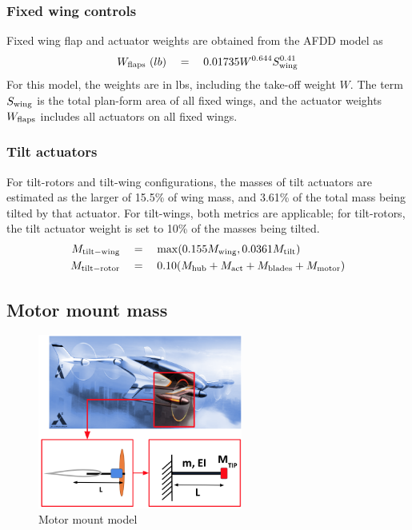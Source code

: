 \subsubsection{Fixed wing controls}
Fixed wing flap and actuator weights are obtained from the AFDD model as 
\begin{equation}
W_{\rm flaps} \textrm{ } (lb) \quad = \quad 0.01735 W^{0.644} S_{\rm wing}^{0.41}
\end{equation}
For this model, the weights are in lbs, including the take-off weight $W$. The term $S_{\rm wing}$ is the total plan-form area of all fixed wings, and the actuator weights $W_{\rm flaps}$ includes all actuators on all fixed wings.

\subsubsection{Tilt actuators}
For tilt-rotors and tilt-wing configurations, the masses of tilt actuators are estimated as the larger of 15.5\% of wing mass, and 3.61\% of the total mass being tilted by that actuator. For tilt-wings, both metrics are applicable; for tilt-rotors, the tilt actuator weight is set to 10\% of the masses being tilted.
\begin{align}
M_{\rm tilt-wing} \quad &= \quad \max(0.155 M_{\rm wing}, 0.0361 M_{\rm tilt}) \\
M_{\rm tilt-rotor} \quad &= \quad 0.10 (M_{\rm hub} + M_{\rm act} + M_{\rm blades} + M_{\rm motor}) 
\end{align}

\subsection{Motor mount mass}
\begin{figure} 
\begin{center}
\includegraphics[width=0.6\textwidth]{images/motor_mount.png}
\caption{Motor mount model}
\label{fig:motor_mount}
\end{center}
\end{figure}


